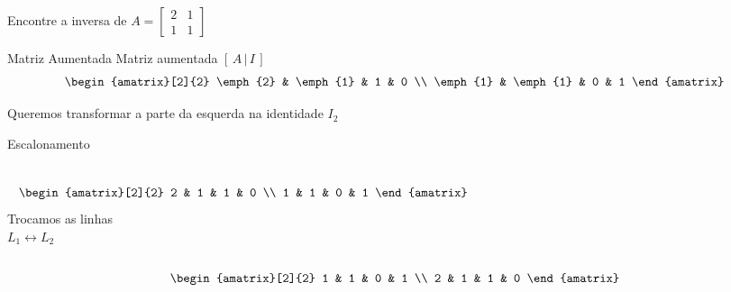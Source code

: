 \begin{question}
  Encontre a inversa de
  \quad
  \(
    A =
    \begin{bmatrix}
      2 & 1 \\
      1 & 1
    \end{bmatrix}
  \)
\end{question}

\begin{resolution}{Matriz Aumentada}
  Matriz aumentada \([\,A\,|\,I\,]\)
  \pause
  \[
    \begin{amatrix}[2]{2}
      \emph{2} & \emph{1} & 1 & 0 \\
      \emph{1} & \emph{1} & 0 & 1
    \end{amatrix}
  \]

  \pause
  Queremos transformar a parte da esquerda na identidade $I_2$
\end{resolution}

\begin{resolution}{Escalonamento}
\begin{columns}
  \[\;\;\;
    \begin{amatrix}[2]{2}
      2 & 1 & 1 & 0 \\
      1 & 1 & 0 & 1
    \end{amatrix}
  \]
  \pause
{}
  Trocamos as linhas
  \\ \pause
  \(
    L_1\leftrightarrow L_2
  \)
\end{columns}

\pause
\[
  \begin{amatrix}[2]{2}
    1 & 1 & 0 & 1 \\
    2 & 1 & 1 & 0
  \end{amatrix}
\]
\end{resolution}

